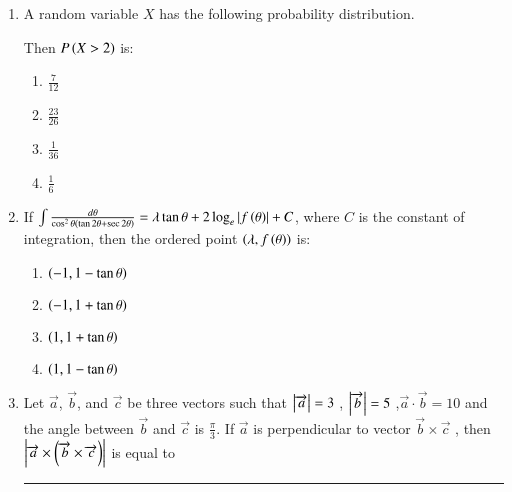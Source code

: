 \documentclass[journal]{IEEEtran}
\begin{document}
\begin{enumerate}
\item A random variable $X$ has the following probability distribution.
    \begin{table}[h!]    
        \centering
        
    \end{table}
    Then $P\left(X>2\right)$ is:
    \begin{multicols}{2}
    \begin{enumerate}
        \item $\frac{7}{12}$\\
        \item $\frac{23}{26}$
        \item $\frac{1}{36}$\\
        \item $\frac{1}{6}$\\
    \end{enumerate}
    \end{multicols}

    \item If $\int \frac{d\theta}{\cos^2 \theta (\tan 2\theta + \sec 2 \theta)} = \lambda \tan \theta + 2 \log_e \left\vert f\left(\theta\right)\right\vert  + C$, where $C$ is the constant of integration, then the ordered point $\left(\lambda, f\left(\theta\right)\right)$ is:
    \begin{multicols}{2}
    \begin{enumerate}
        \item $\left(-1, 1-\tan \theta\right)$\\
        \item $\left(-1, 1+\tan \theta\right)$\\
        \item $\left(1, 1+\tan \theta\right)$\\
        \item $\left(1, 1-\tan \theta\right)$
    \end{enumerate}
    \end{multicols}

    \item Let $\Vec{a}$, $\vec{b}$, and $\vec{c}$ be three vectors such that $\left\vert\overrightarrow a\right\vert=3$ , $\left\vert\overrightarrow b\right\vert=5$ ,$\overrightarrow{a}\cdot \overrightarrow{b}= 10$ and the angle between $\overrightarrow{b}$ and $\overrightarrow{c}$ is $\frac{\pi}{3}$. If $\overrightarrow{a}$ is perpendicular to vector $\overrightarrow{b} \times \overrightarrow{c}$ ,  then $\left\vert\overrightarrow{a} \times \left(\overrightarrow{b}\times \overrightarrow{c}\right)\right\vert$ is equal to \rule{1cm}{0.15mm}\\


\end{enumerate}
\end{document}
